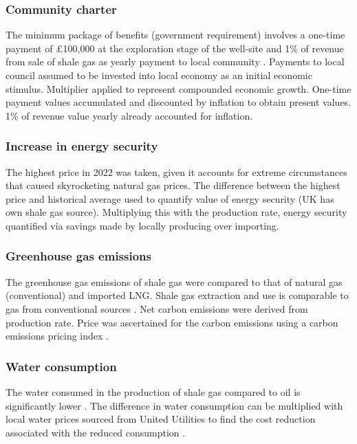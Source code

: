 \documentclass[10pt]{article}
\begin{document}
\subsubsection{Community charter}
The minimum package of benefits (government requirement) involves a one-time payment of \pounds 100,000 at the exploration stage of the well-site and 1\% of revenue from sale of shale gas as yearly payment to local community \cite{007}. Payments to local council assumed to be invested into local economy as an initial economic stimulus. Multiplier applied to represent compounded economic growth. One-time payment values accumulated and discounted by inflation to obtain present values. 1\% of revenue value yearly already accounted for inflation.
\subsubsection{Increase in energy security}
The highest price in 2022 was taken, given it accounts for extreme circumstances that caused skyrocketing natural gas prices. The difference between the highest price and historical average \cite{008} used to quantify value of energy security (UK has own shale gas source). Multiplying this with the production rate, energy security quantified via savings made by locally producing over importing. 
\subsubsection{Greenhouse gas emissions}
The greenhouse gas emissions of shale gas were compared to that of natural gas (conventional) and imported LNG. Shale gas extraction and use is comparable to gas from conventional sources \cite{009}. Net carbon emissions were derived from production rate. Price was ascertained for the carbon emissions using a carbon emissions pricing index \cite{008}. 
\subsubsection{Water consumption}
The water consumed in the production of shale gas compared to oil is significantly lower \cite{010}. The difference in water consumption can be multiplied with local water prices sourced from United Utilities to find the cost reduction associated with the reduced consumption \cite{011}.
\end{document}
